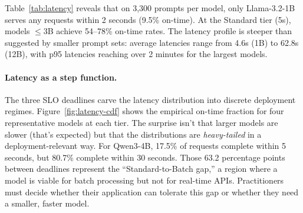 \documentclass[11pt]{article}
\begin{document}
Table~\ref{tab:latency} reveals that on 3{,}300 prompts per model, only Llama-3.2-1B serves any requests within 2 seconds (9.5\% on-time).  At the Standard tier (5s), models $\leq$3B achieve 54--78\% on-time rates.  The latency profile is steeper than suggested by smaller prompt sets: average latencies range from 4.6s (1B) to 62.8s (12B), with p95 latencies reaching over 2 minutes for the largest models.

\paragraph{Latency as a step function.}
The three SLO deadlines carve the latency distribution into discrete deployment regimes.  Figure~\ref{fig:latency-cdf} shows the empirical on-time fraction for four representative models at each tier.  The surprise isn't that larger models are slower (that's expected) but that the distributions are \emph{heavy-tailed} in a deployment-relevant way.  For Qwen3-4B, 17.5\% of requests complete within 5 seconds, but 80.7\% complete within 30 seconds.  Those 63.2 percentage points between deadlines represent the ``Standard-to-Batch gap,'' a region where a model is viable for batch processing but not for real-time APIs.  Practitioners must decide whether their application can tolerate this gap or whether they need a smaller, faster model.
\end{document}
